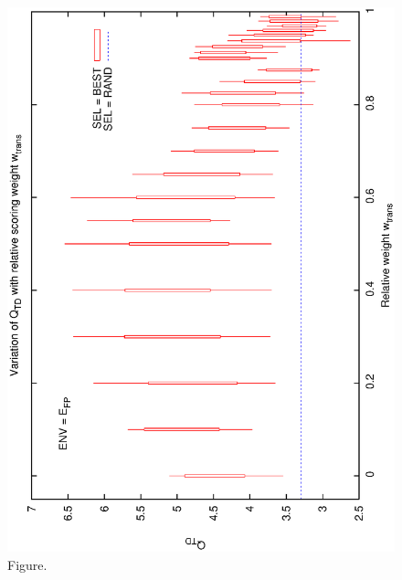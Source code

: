 \documentclass[12pt,a4paper]{article}
\begin{document}
\begin{figure}[htbp]
 \begin{center}
  \includegraphics[scale=1.0, angle=0]{figures/cs1_dw1_td.eps}
 \end{center}
  \caption[Figure.]
{Figure.}
\end{figure}
\clearpage
\end{document}
